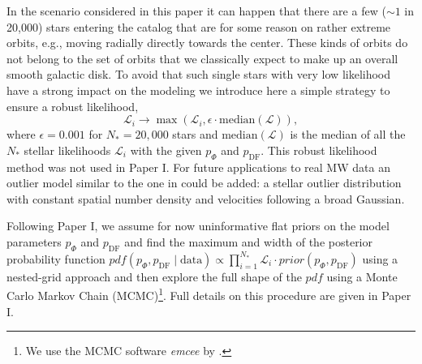 \documentclass[iop,revtex4,numberedappendix,appendixfloats]{emulateapj}
\newcommand{\pdf}{\ensuremath{pdf}}
\newcommand{\NEW}[1]{\textcolor{Green}{#1}}
\newcommand{\OLD}[1]{}
\begin{document}
In the scenario considered in this paper it can happen that there are a few ($\sim 1$ in 20,000) stars entering the catalog that are for some reason  on rather extreme orbits, e.g., moving radially directly towards the center. These kinds of orbits do not belong to the set of orbits that we classically expect to make up an overall smooth galactic disk. To avoid that such single stars with very low likelihood have a strong impact on the modeling we introduce here a simple strategy to ensure a robust likelihood,
\begin{equation}
\mathscr{L}_i \longrightarrow \max \left( \mathscr{L}_i, \epsilon \cdot \text{median}(\mathscr{L})\right),
\end{equation}
where $\epsilon = 0.001$ for $N_*=20,000$ stars and $\text{median}(\mathscr{L})$ is the median of all the $N_*$ stellar likelihoods $\mathscr{L}_i$ with the given $p_\Phi$ and $p_\text{DF}$. This robust likelihood method was not used in Paper I. For future applications to real MW data an outlier model similar to the one in \OLD{\citet{2013ApJ...773...43B}}\NEW{\citet{2016ApJ...823...30B}} could be added: a stellar outlier distribution with constant spatial number density and velocities following a broad Gaussian.

Following Paper I, we assume for now uninformative flat priors on the model parameters $p_\Phi$ and $p_\text{DF}$ and find the maximum and width of the posterior probability function $pdf(p_\Phi,p_\text{DF} \mid \text{data}) \propto \prod_{i=1}^{N_*} \mathscr{L}_i \cdot prior(p_\Phi,p_\text{DF})$ using a nested-grid approach and then explore the full shape of the $\pdf$ using a Monte Carlo Markov Chain (MCMC)\footnote{We use the MCMC software \emph{emcee} by \citet{2013PASP..125..306F}.}. Full details on this procedure are given in Paper I.
\end{document}
